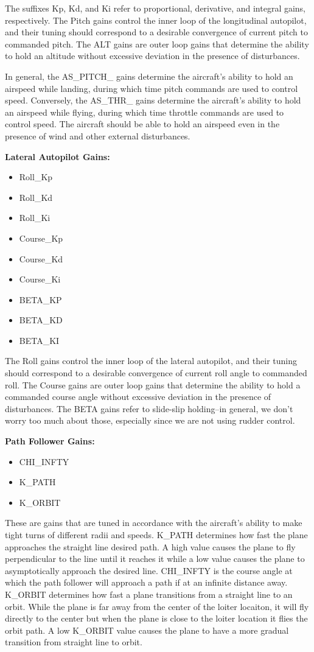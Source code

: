 \documentclass[]{auvsi_doc}
\begin{document}
The suffixes Kp, Kd, and Ki refer to proportional, derivative, and integral gains, respectively. The Pitch gains control the inner loop of the longitudinal autopilot, and their tuning should correspond to a desirable convergence of current pitch to commanded pitch. The ALT gains are outer loop gains that determine the ability to hold an altitude without excessive deviation in the presence of disturbances.

In general, the AS\_PITCH\_\* gains determine the aircraft's ability to hold an airspeed while landing, during which time pitch commands are used to control speed. Conversely, the AS\_THR\_\* gains determine the aircraft's ability to hold an airspeed while flying, during which time throttle commands are used to control speed. The aircraft should be able to hold an airspeed even in the presence of wind and other external disturbances.

\textbf{Lateral Autopilot Gains:}
\begin{itemize}
	\item Roll\_Kp
	\item Roll\_Kd
	\item Roll\_Ki
	\item Course\_Kp
	\item Course\_Kd
	\item Course\_Ki
	\item BETA\_KP
	\item BETA\_KD
	\item BETA\_KI
\end{itemize}

The Roll gains control the inner loop of the lateral autopilot, and their tuning should correspond to a desirable convergence of current roll angle to commanded roll. The Course gains are outer loop gains that determine the ability to hold a commanded course angle without excessive deviation in the presence of disturbances. The BETA gains refer to slide-slip holding--in general, we don't worry too much about those, especially since we are not using rudder control.

\textbf{Path Follower Gains:}
\begin{itemize}
	\item CHI\_INFTY
	\item K\_PATH
	\item K\_ORBIT
\end{itemize}

These are gains that are tuned in accordance with the aircraft's ability to make tight turns of different radii and speeds. K\_PATH determines how fast the plane approaches the straight line desired path. A high value causes the plane to fly perpendicular to the line until it reaches it while a low value causes the plane to asymptotically approach the desired line. CHI\_INFTY is the course angle at which the path follower will approach a path if at an infinite distance away. K\_ORBIT determines how fast a plane transitions from a straight line to an orbit. While the plane is far away from the center of the loiter locaiton, it will fly directly to the center but when the plane is close to the loiter location it flies the orbit path. A low K\_ORBIT value causes the plane to have a more gradual transition from straight line to orbit.
\end{document}

